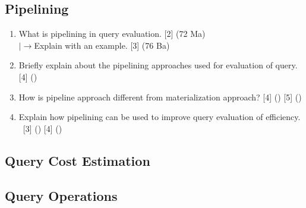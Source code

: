 \documentclass[12pt]{article}
\newcommand{\lb}{\\$\left|\rightarrow\right.$}
\newcommand{\enter}{\\\textcolor{white}{1}}
\begin{document}
    \subsection{Pipelining}
        \begin{enumerate}[noitemsep, topsep=0pt]
			\item What is pipelining in query evaluation. \hfill [2] (72 Ma)
			\lb Explain with an example. \hfill [3] (76 Ba)     
        
            \item Briefly explain about the pipelining approaches used for evaluation of query. \hfill [4] ()
            
            \item How is pipeline approach different from materialization approach? \hfill [4] () [5] ()
            
            \item Explain how pipelining can be used to improve query evaluation of efficiency.
            \enter\hfill [3] () [4] ()
        \end{enumerate}
        
    \subsection{Query Cost Estimation}
    \subsection{Query Operations}
\end{document}

